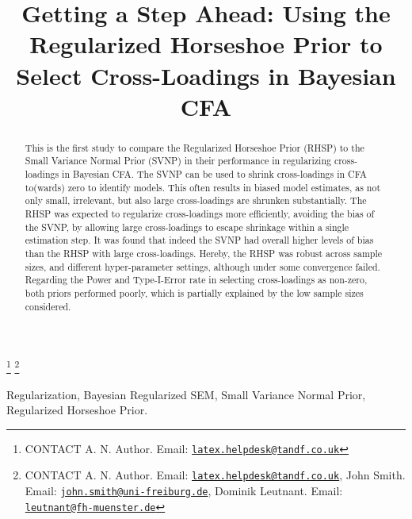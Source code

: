 \documentclass[]{interact}
\theoremstyle{plain}%
\theoremstyle{definition}
\theoremstyle{remark}
\begin{document}
\articletype{}

\title{Getting a Step Ahead: Using the Regularized Horseshoe Prior to
Select Cross-Loadings in Bayesian CFA}


\author{
}

\thanks{CONTACT A. N.
Author. Email: \href{mailto:latex.helpdesk@tandf.co.uk}{\nolinkurl{latex.helpdesk@tandf.co.uk}}}
\thanks{CONTACT A. N.
Author. Email: \href{mailto:latex.helpdesk@tandf.co.uk}{\nolinkurl{latex.helpdesk@tandf.co.uk}}, John
Smith. Email: \href{mailto:john.smith@uni-freiburg.de}{\nolinkurl{john.smith@uni-freiburg.de}}, Dominik
Leutnant. Email: \href{mailto:leutnant@fh-muenster.de}{\nolinkurl{leutnant@fh-muenster.de}}}

\maketitle

\begin{abstract}
This is the first study to compare the Regularized Horseshoe Prior
(RHSP) to the Small Variance Normal Prior (SVNP) in their performance in
regularizing cross-loadings in Bayesian CFA. The SVNP can be used to
shrink cross-loadings in CFA to(wards) zero to identify models. This
often results in biased model estimates, as not only small, irrelevant,
but also large cross-loadings are shrunken substantially. The RHSP was
expected to regularize cross-loadings more efficiently, avoiding the
bias of the SVNP, by allowing large cross-loadings to escape shrinkage
within a single estimation step. It was found that indeed the SVNP had
overall higher levels of bias than the RHSP with large cross-loadings.
Hereby, the RHSP was robust across sample sizes, and different
hyper-parameter settings, although under some convergence failed.
Regarding the Power and Type-I-Error rate in selecting cross-loadings as
non-zero, both priors performed poorly, which is partially explained by
the low sample sizes considered.
\end{abstract}

\begin{keywords}
Regularization, Bayesian Regularized SEM, Small Variance Normal Prior,
Regularized Horseshoe Prior.
\end{keywords}
\end{document}
